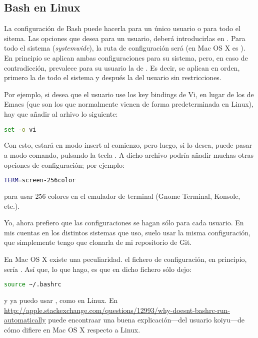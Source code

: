 \subsection{Bash en Linux}\label{subsec:bash-l}
La configuración de Bash puede hacerla para un único usuario o para todo el sitema. Las opciones que desea para
un usuario, deberá introducirlas en . Para todo el sistema
(\foreignlanguage{english}{\textit{systemwide}}), la ruta de configuración será  (en Mac
OS X es ). En principio se aplican ambas configuraciones para su sistema, pero, en caso de
contradicción, prevalece para su usuario la de . Es decir, se aplican en orden, primero la de
todo el sistema y después la del usuario sin restricciones.

Por ejemplo, si desea que el usuario  use los key bindings de Vi, en lugar de los de Emacs
(que son los que normalmente vienen de forma predeterminada en Linux), hay que añadir al arhivo
 lo siguiente:

\begin{lstlisting}[gobble=2,language=bash,style=bashinteract,escapechar=!]
  set -o vi
\end{lstlisting}

\noindent Con esto, estará en modo insert al comienzo, pero luego, si lo desea, puede pasar a modo comando,
pulsando la tecla . A dicho archivo podría añadir muchas otras opciones de configuración; por
ejemplo:

\begin{lstlisting}[gobble=2,language=bash,style=bashinteract,escapechar=!]
  TERM=screen-256color
\end{lstlisting}

\noindent para usar 256 colores en el emulador de terminal (Gnome Terminal, Konsole, etc.).

Yo, ahora prefiero que las configuraciones se hagan sólo para cada usuario. En mis cuentas en los distintos
sistemas que uso, suelo usar la misma configuración, que simplemente tengo que clonarla de mi repositorio de
Git.

En Mac OS X existe una peculiaridad. el fichero de configuración, en principio, sería .
Así que, lo que hago, es que en dicho fichero sólo dejo:

\begin{lstlisting}[gobble=2,language=bash,style=bashinteract,escapechar=!]
  source ~/.bashrc
\end{lstlisting}

\noindent y ya puedo usar , como en Linux. En
\url{http://apple.stackexchange.com/questions/12993/why-doesnt-bashrc-run-automatically} puede encontraar una
buena explicación---del usuario koiyu---de cómo difiere en Mac OS X respecto a Linux.

